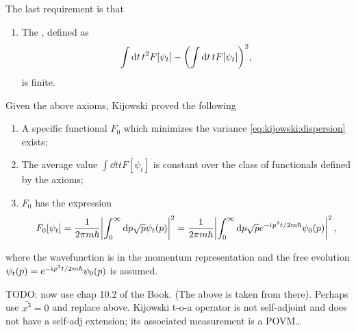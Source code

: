 The last requirement is that
\begin{enumerate}[resume]
  \item
    The , defined as
    \begin{equation}\label{eq:kijowski:dispersion}
      \int \dd{t} t^2 F[\psi_t] - \qty(\int \dd{t} t F[\psi_t] )^2 \text{,}
    \end{equation}
    is finite.
\end{enumerate}

Given the above axioms, Kijowski proved the following
\begin{theorem}
  \hphantom{1}
  \begin{enumerate}
    \item
      A specific functional $F_0$ which minimizes the variance
      \eqref{eq:kijowski:dispersion}
      exists;
    \item
      The average value $\int \dd{t} t F[\psi_t] $ is constant over the class of
      functionals defined by the axioms;
    \item
      $F_0$ has the expression
      \begin{equation}
        F_0[\psi_t] = \frac{1}{2 \pi m \hbar} \abs{\int_0^{\infty} \dd p \sqrt{p} \psi_{t}(p)}^2 =
                      \frac{1}{2 \pi m \hbar} \abs{\int_0^{\infty} \dd p \sqrt{p} e^{-\mathrm{i}\mkern1mu p^{2} t / 2m\hbar} \psi_{0}(p)}^2
                      \, \text{,}
      \end{equation}
  \end{enumerate}
  where the wavefunction is in the momentum representation and the free evolution
  $\psi_t(p) = e^{-\mathrm{i}\mkern1mu p^{2} t / 2m\hbar}\psi_{0}(p)$
  is assumed.
\end{theorem}

TODO: now use chap 10.2 of the Book. (The  above is taken from there). Perhaps use $\bar{x^3}=0$ and replace above. Kijowski
t-o-a operator is not self-adjoint and does not have a self-adj extension; its associated
measurement is a POVM\dots

